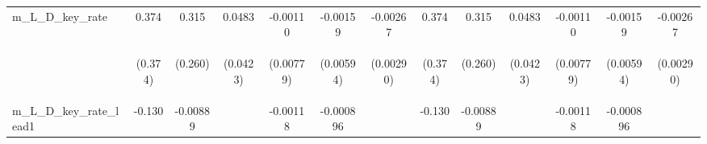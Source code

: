 \documentclass[]{article}
\begin{document}
\begin{center}
\begin{tabular}{lcccccccccccc}
m\_L\_D\_key\_rate & 0.374 & 0.315 & 0.0483 & -0.00110 & -0.00159 & -0.00267 & 0.374 & 0.315 & 0.0483 & -0.00110 & -0.00159 & -0.00267 \\
\vspace{4pt} & \begin{footnotesize}(0.374)\end{footnotesize} & \begin{footnotesize}(0.260)\end{footnotesize} & \begin{footnotesize}(0.0423)\end{footnotesize} & \begin{footnotesize}(0.00779)\end{footnotesize} & \begin{footnotesize}(0.00594)\end{footnotesize} & \begin{footnotesize}(0.00290)\end{footnotesize} & \begin{footnotesize}(0.374)\end{footnotesize} & \begin{footnotesize}(0.260)\end{footnotesize} & \begin{footnotesize}(0.0423)\end{footnotesize} & \begin{footnotesize}(0.00779)\end{footnotesize} & \begin{footnotesize}(0.00594)\end{footnotesize} & \begin{footnotesize}(0.00290)\end{footnotesize} \\
m\_L\_D\_key\_rate\_lead1 & -0.130 & -0.00889 &  & -0.00118 & -0.000896 &  & -0.130 & -0.00889 &  & -0.00118 & -0.000896 &  \\

\end{tabular}
\end{center}
\end{document}
